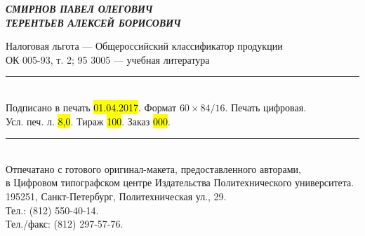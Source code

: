 \thispagestyle{title}

\null\nointerlineskip\vfill

\begin{center}
\textbf{\textit{СМИРНОВ ПАВЕЛ ОЛЕГОВИЧ\\ ТЕРЕНТЬЕВ АЛЕКСЕЙ БОРИСОВИЧ}}
\end{center}

\vfill\vfill

\makeatletter
\begin{center}
{\large\textbf{\MakeUppercase{\@title}}}

\vskip1cm

\textbf{\textit{\@subtitle}}
\end{center}
\makeatother

\vfill\vfill\vfill

\begin{center}
Налоговая льгота — Общероссийский классификатор продукции\\
ОК 005-93, т. 2; 95 3005 — учебная литература

\rule{\textwidth}{1pt}\\[.5em]
Подписано в печать \hl{01.04.2017}. Формат $60\times84/16$. Печать цифровая.\\
Усл. печ. л. \hl{8,0}. Тираж \hl{100}. Заказ \hl{000}.\\
\rule{\textwidth}{1pt}\\[.5em]

Отпечатано с готового оригинал-макета, предоставленного авторами,\\
в Цифровом типографском центре Издательства Политехнического университета.\\
195251, Санкт-Петербург, Политехническая ул., 29.\\
Тел.: (812) 550-40-14.\\
Тел./факс: (812) 297-57-76.
\end{center}
